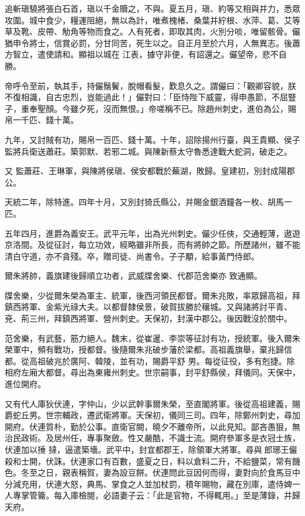 \begin{pinyinscope}
 追斬瑱驍將張白石首，瑱以千金贖之，不與。夏五月，瑱、約等又相與并力，悉眾攻圍。城中食少，糧運阻絕，無以為計，唯煮槐楮、桑葉并紵根、水萍、葛、艾等草及靴、皮帶、觔角等物而食之。人有死者，即取其肉，火別分啖，唯留骸骨。儼猶申令將士，信賞必罰，分甘同苦，死生以之。自正月至於六月，人無異志。後蕭方智立，遣使請和。顯祖以城在
 江表，據守非便，有詔還之。儼望帝，悲不自勝。



 帝呼令至前，執其手，持儼鬚鬢，脫帽看髮，歎息久之。謂儼曰：「觀卿容貌，朕不復相識，自古忠烈，豈能過此！」儼對曰：「臣恃陛下威靈，得申愚節，不屈豎子，重奉聖顏。今雖夕死，沒而無恨。」帝嗟稱不已。除趙州刺史，進伯為公，賜帛一千匹、錢十萬。



 九年，又討賊有功，賜帛一百匹、錢十萬。十年，詔除揚州行臺，與王貴顯、侯子監將兵衛送蕭莊。築郭默、若邪二城。與陳新蔡太守魯悉達戰大蛇洞，破走之。



 又
 監蕭莊、王琳軍，與陳將侯瑱、侯安都戰於蕪湖，敗歸。皇建初，別封成陽郡公。



 天統二年，除特進。四年十月，又別封猗氏縣公，并賜金銀酒鐘各一枚、胡馬一匹。



 五年四月，進爵為義安王。武平元年，出為光州刺史。儼少任俠，交通輕薄，遨遊京洛間。及從征討，每立功效，經略雖非所長，而有將帥之節。所歷諸州，雖不能清白守道，亦不貪殘。卒，贈司徒、尚書令。子子顒，給事黃門侍郎。



 爾朱將帥，義旗建後歸順立功者，武威牒舍樂、代郡范舍樂亦
 致通顯。



 牒舍樂，少從爾朱榮為軍主、統軍，後西河領民都督。爾朱兆敗，率眾歸高祖，拜鎮西將軍、金紫光祿大夫。以都督隸侯景，破賀拔勝於穰城。又與諸將討平青、兗、荊三州，拜鎮西將軍、營州刺史。天保初，封漢中郡公。後因戰沒於關中。



 范舍樂，有武藝，筋力絕人。魏末，從崔暹、李崇等征討有功，授統軍。後入爾朱榮軍中，頻有戰功，授都督。後隨爾朱兆破步藩於梁都。高祖義旗舉，棄兆歸信都。從高祖破兆於廣阿、韓陵，並有功，賜爵平舒
 男。每從征役，多有剋捷。除相府左廂大都督。尋出為東雍州刺史。世宗嗣事，封平舒縣侯，拜儀同。天保中，進位開府。



 又有代人庫狄伏連，字仲山，少以武幹事爾朱榮，至直閣將軍。後從高祖建義，賜爵蛇丘男。世宗輔政，遷武衛將軍。天保初，儀同三司。四年，除鄭州刺史，尋加開府。伏連質朴，勤於公事。直衛官闕，曉夕不離帝所，以此見知。鄙吝愚狠，無治民政術。及居州任，專事聚斂。性又嚴酷，不識士流。開府參軍多是衣冠士族，伏連加以捶
 撻，逼遣築墻。武平中，封宜都郡王，除領軍大將軍。尋與郎琊王儼殺和士開，伏誅。伏連家口有百數，盛夏之日，料以倉料二升，不給鹽菜，常有饑色。冬至之日，親表稱賀，妻為設豆餅。伏連問此豆因何而得，妻對向於食馬豆中分減充用，伏連大怒，典馬、掌食之人並加杖罰，積年賜物，藏在別庫，遣侍婢一人專掌管籥。每入庫檢閱，必語妻子云：「此是官物，不得輒用。」至是薄錄，并歸天府。




\end{pinyinscope}
